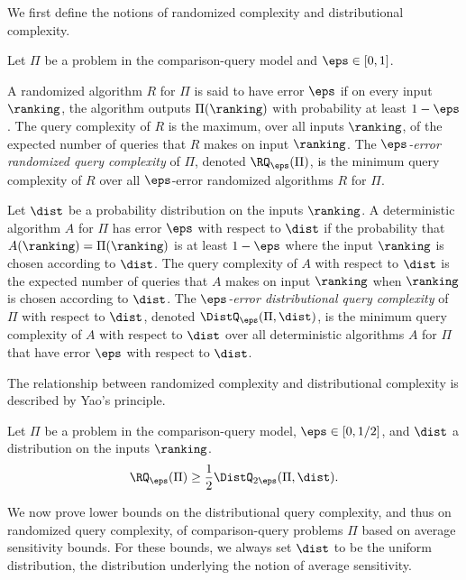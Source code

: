 \documentclass{toc}
\begin{document}
We first define the notions of randomized complexity and distributional complexity.

\begin{definition}
Let $\Pi$ be a problem in the comparison-query model and $\eps \in [0,1]$.

A randomized algorithm $R$ for $\Pi$ is said to have error $\eps$ if on every input $\ranking$, the algorithm outputs $\Pi(\ranking)$ with probability at least $1-\eps$. The query complexity of $R$ is the maximum, over all inputs $\ranking$, of the expected number of queries that $R$ makes on input $\ranking$. The \emph{$\eps$-error randomized query complexity} of $\Pi$, denoted $\RQ_{\eps}(\Pi)$, is the minimum query complexity of $R$ over all $\eps$-error randomized algorithms $R$ for $\Pi$.

Let $\dist$ be a probability distribution on the inputs $\ranking$. A deterministic algorithm $A$ for $\Pi$ has error $\eps$ with respect to $\dist$ if the probability that $A(\ranking)=\Pi(\ranking)$ is at least $1-\eps$ where the input $\ranking$ is chosen according to $\dist$. The query complexity of $A$ with respect to $\dist$ is the expected number of queries that $A$ makes on input $\ranking$ when $\ranking$ is chosen according to $\dist$. The \emph{$\eps$-error distributional query complexity} of $\Pi$ with respect to $\dist$, denoted $\DistQ_{\eps}(\Pi,\dist)$, is the minimum query complexity of $A$ with respect to $\dist$ over all deterministic algorithms $A$ for $\Pi$ that have error $\eps$ with respect to $\dist$.
\end{definition}

The relationship between randomized complexity and distributional complexity is described by Yao's principle. 

\begin{lemma}
	\label{lemma:yaos-principle}
	Let $\Pi$ be a problem in the comparison-query model, $\eps \in [0,1/2]$, and $\dist$ a distribution on the inputs $\ranking$.
	\begin{equation}\label{eq:yao}
	\RQ_{\eps}(\Pi) \ge \frac{1}{2}\DistQ_{2\eps}(\Pi, \dist). 
	\end{equation}
\end{lemma}

We now prove lower bounds on the distributional query complexity, and thus on randomized query complexity, of comparison-query problems $\Pi$ based on average sensitivity bounds. For these bounds, we always set $\dist$ to be the uniform distribution, the distribution underlying the notion of average sensitivity. 
\end{document}
